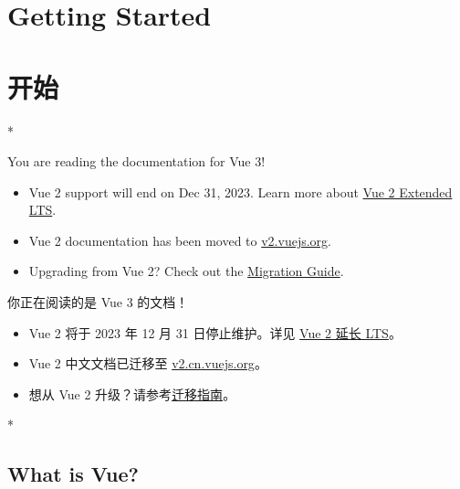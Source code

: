 
\begin{paracol}{2}
\section{Getting Started}
\switchcolumn
\section{开始}
\switchcolumn[0]*%
\begin{vueQuote}{You are reading the documentation for Vue 3!}
\begin{itemize}
    \item
      Vue 2 support will end on Dec 31, 2023. Learn more about
      \href{https://v2.vuejs.org/lts/}{Vue 2 Extended LTS}.
    \item
      Vue 2 documentation has been moved to
      \href{https://v2.vuejs.org/}{v2.vuejs.org}.
    \item
      Upgrading from Vue 2? Check out the
      \href{https://v3-migration.vuejs.org/}{Migration Guide}.
    \end{itemize}
\end{vueQuote}
\switchcolumn
\begin{vueQuote}{你正在阅读的是 Vue 3 的文档！}
\begin{itemize}
\item
    Vue 2 将于 2023 年 12 月 31 日停止维护。详见
    \href{https://v2.vuejs.org/lts/}{Vue 2 延长 LTS}。
\item
    Vue 2 中文文档已迁移至
    \href{https://v2.cn.vuejs.org/}{v2.cn.vuejs.org}。
\item
    想从 Vue 2
    升级？请参考\href{https://v3-migration.vuejs.org/}{迁移指南}。
\end{itemize}
\end{vueQuote}
\switchcolumn[0]*%
\subsection{What is Vue?}
\switchcolumn

\end{paracol}
